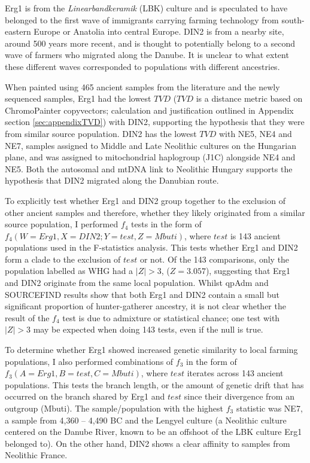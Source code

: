 Erg1 is from the \textit{Linearbandkeramik} (LBK) culture and is speculated to have belonged to the first wave of immigrants carrying farming technology from south-eastern Europe or Anatolia into central Europe. DIN2 is from a nearby site, around 500 years more recent, and is thought to potentially belong to a second wave of farmers who migrated along the Danube. It is unclear to what extent these different waves corresponded to populations with different ancestries.  

When painted using 465 ancient samples from the literature and the newly sequenced samples, Erg1 had the lowest $TVD$ ($TVD$ is a distance metric based on ChromoPainter copyvectors; calculation and justification outlined in Appendix section \ref{sec:appendixTVD}) with DIN2, supporting the hypothesis that they were from similar source population. DIN2  has the lowest $TVD$ with NE5, NE4 and NE7, samples assigned to Middle and Late Neolithic cultures on the Hungarian plane, and was assigned to mitochondrial haplogroup (J1C) alongside NE4 and NE5. Both the autosomal and mtDNA link to Neolithic Hungary supports the hypothesis that DIN2 migrated along the Danubian route.   

To explicitly test whether Erg1 and DIN2 group together to the exclusion of other ancient samples and therefore, whether they likely originated from a similar source population, I performed $f_{4}$ tests in the form of $f_{4}(W=Erg1, X=DIN2; Y=test, Z=Mbuti)$, where $test$ is 143 ancient populations used in the F-statistics analysis. This tests whether Erg1 and DIN2 form a clade to the exclusion of $test$ or not. Of the 143 comparisons, only the population labelled as WHG had a $|Z|>3$, ($Z=3.057$), suggesting that Erg1 and DIN2 originate from the same local population. Whilst qpAdm and SOURCEFIND results show that both Erg1 and DIN2 contain a small but significant proportion of hunter-gatherer ancestry, it is not clear whether the result of the $f_{4}$ test is due to admixture or statistical chance; one test with $|Z|>3$ may be expected when doing 143 tests, even if the null is true.

To determine whether Erg1 showed increased genetic similarity to local farming populations, I also performed combinations of $f_{3}$ in the form of $f_{3}(A=Erg1, B=test, C=Mbuti)$, where $test$ iterates across 143 ancient populations. This tests the branch length, or the amount of genetic drift that has occurred on the branch shared by Erg1 and $test$ since their divergence from an outgroup (Mbuti). The sample/population with the highest $f_{3}$ statistic was NE7, a sample from 4,360 – 4,490 BC and the Lengyel culture (a Neolithic culture centered on the Danube River, known to be an offshoot of the LBK culture Erg1 belonged to). On the other hand, DIN2 shows a clear affinity to samples from Neolithic France.


